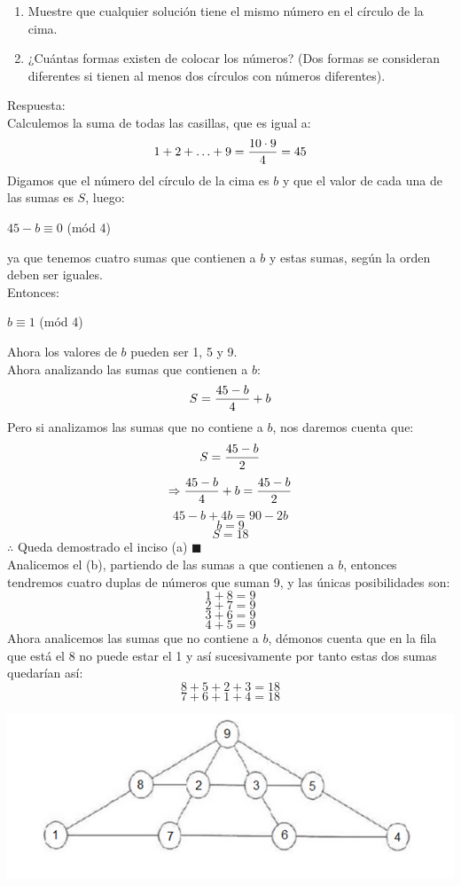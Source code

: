 \documentclass{book}
\begin{document}
\begin{enumerate}
          \begin{enumerate}
              \item Muestre que cualquier solución tiene el mismo número en el círculo de la cima.
              \item ¿Cuántas formas existen de colocar los números? (Dos formas se consideran diferentes si tienen al menos dos círculos con números diferentes).
          \end{enumerate}
          Respuesta:\\
          Calculemos la suma de todas las casillas, que es igual a:
          $$1+2+\ldots +9={10\cdot 9\over 4}=45$$
          Digamos que el número del círculo de la cima es $b$ y que el valor de cada una de las sumas es $S$, luego:
          \begin{center}
              $45-b\equiv 0$ (mód 4)
          \end{center}
          ya que tenemos cuatro sumas que contienen a $b$ y estas sumas, según la orden deben ser iguales.\\
          Entonces:
          \begin{center}
              $b\equiv 1$ (mód 4)
          \end{center}
          Ahora los valores de $b$ pueden ser 1, 5 y 9.\\
          Ahora analizando las sumas que contienen a $b$:
          $$S={45-b\over 4}+b$$
          Pero si analizamos las sumas que no contiene a $b$, nos daremos cuenta que:
          $$S={45-b\over 2}$$
          $$\Rightarrow {45-b\over 4}+b={45-b\over 2}$$
          $$45-b+4b=90-2b$$
          $$b=9$$
          $$S=18$$
          $\therefore$ Queda demostrado el inciso (a) $\blacksquare$\\
          Analicemos el (b), partiendo de las sumas a que contienen a $b$, entonces tendremos cuatro duplas de números que suman 9, y las únicas posibilidades son:
          $$1+8=9$$
          $$2+7=9$$
          $$3+6=9$$
          $$4+5=9$$
          Ahora analicemos las sumas que no contiene a $b$, démonos cuenta que en la fila que está el 8 no puede estar el 1 y así sucesivamente por tanto estas dos sumas quedarían así:
          $$8+5+2+3=18$$
          $$7+6+1+4=18$$
          \begin{center}
              \includegraphics[scale=1]{imagenes/Combinatoria/1,2.png}

\end{center}
\end{enumerate}
\end{document}
